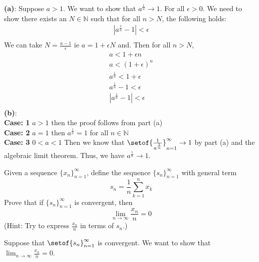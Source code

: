 \documentclass[answers,12pt,addpoints]{exam}
\begin{document}
\begin{questions}
        \begin{solution}
            \textbf{(a)}: Suppose $a > 1$. We want to show that $a^{\frac{1}{n}} \to 1$. For all $\epsilon > 0$. We need to show there exists an $N \in \mathbb{N}$ such that for all $n > N$, the following holds:
            \begin{align*}
                |a^{\frac{1}{n}} - 1| < \epsilon\\
            \end{align*}
            We can take $N = \frac{a -1}{\epsilon}$ ie $a = 1+ \epsilon N$ and. Then for all $n > N$, 
            \begin{align*}
                a < 1 + \epsilon n \\
                a < (1 + \epsilon)^n\\
                a^{\frac{1}{n}} < 1 + \epsilon\\
                a^{\frac{1}{n}} - 1 < \epsilon\\
                |a^{\frac{1}{n}} - 1| < \epsilon\\
            \end{align*}
            \textbf{(b)}: \\
            \textbf{Case: 1} $a >1 $ then the proof follows from part (a)\\
            \textbf{Case: 2} $a = 1$ then $a^{\frac{1}{n}} = 1$ for all $n \in \mathbb{N}$\\
            \textbf{Case: 3} $0 < a < 1$ Then we know that $\setof{\frac{1}{a^{\frac{1}{n}}}}_{n=1}^{\infty} \to 1$ by part (a) and the algebraic limit theorem. 
            Thus, we have $a^{\frac{1}{n}} \to 1$.
        \end{solution}
        \question Given a sequence $\{x_n\}_{n=1}^{\infty}$, define the sequence $\{s_n\}_{n=1}^{\infty}$ with general term
        \[
        s_n = \frac{1}{n} \sum_{k=1}^{n} x_k
        \]
        Prove that if $\{s_n\}_{n=1}^{\infty}$ is convergent, then
        \[
        \lim_{n \to \infty} \frac{x_n}{n} = 0
        \]
        (Hint: Try to express $\frac{x_n}{n}$ in terms of $s_n$.)
        \begin{solution}
            Suppose that $\setof{s_n}_{n=1}^{\infty}$ is convergent. We want to show that $\lim_{n \to \infty} \frac{x_n}{n} = 0$.\\

\end{solution}
\end{questions}
\end{document}
